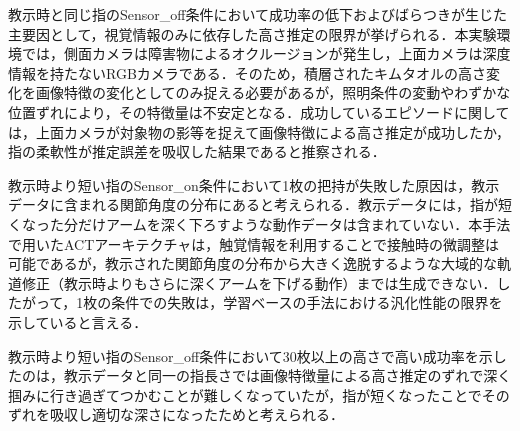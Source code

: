教示時と同じ指のSensor\_off条件において成功率の低下およびばらつきが生じた主要因として，視覚情報のみに依存した高さ推定の限界が挙げられる．本実験環境では，側面カメラは障害物によるオクルージョンが発生し，上面カメラは深度情報を持たないRGBカメラである．そのため，積層されたキムタオルの高さ変化を画像特徴の変化としてのみ捉える必要があるが，照明条件の変動やわずかな位置ずれにより，その特徴量は不安定となる．成功しているエピソードに関しては，上面カメラが対象物の影等を捉えて画像特徴による高さ推定が成功したか，指の柔軟性が推定誤差を吸収した結果であると推察される．\par
教示時より短い指のSensor\_on条件において1枚の把持が失敗した原因は，教示データに含まれる関節角度の分布にあると考えられる．教示データには，指が短くなった分だけアームを深く下ろすような動作データは含まれていない．本手法で用いたACTアーキテクチャは，触覚情報を利用することで接触時の微調整は可能であるが，教示された関節角度の分布から大きく逸脱するような大域的な軌道修正（教示時よりもさらに深くアームを下げる動作）までは生成できない．したがって，1枚の条件での失敗は，学習ベースの手法における汎化性能の限界を示していると言える．\par
教示時より短い指のSensor\_off条件において30枚以上の高さで高い成功率を示したのは，教示データと同一の指長さでは画像特徴量による高さ推定のずれで深く掴みに行き過ぎてつかむことが難しくなっていたが，指が短くなったことでそのずれを吸収し適切な深さになったためと考えられる．